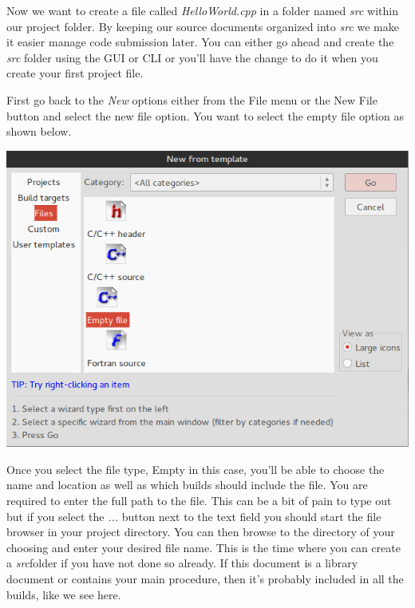 \documentclass[10pt]{article}
\begin{document}
Now we want to create a file called \textit{HelloWorld.cpp} in a folder named \textit{src} within our project folder. By keeping our source documents organized into \textit{src} we make it easier manage code submission later. You can either go ahead and create the \textit{src} folder using the GUI or CLI or you'll have the change to do it when you create your first project file.

First go back to the \textit{New} options either from the File menu or the New File button and select the new file option. You want to select the empty file option as shown below.

\vspace{.1in}
\begin{center}
\includegraphics[scale=.5]{CB_NewFileEmptyCPP.png}
\end{center}
\vspace{.1in}

Once you select the file type, Empty in this case, you'll be able to choose the name and location as well as which builds should include the file. You are required to enter the full path to the file. This can be a bit of pain to type out but if you select the \textit{...} button next to the text field you should start the file browser in your project directory. You can then browse to the directory of your choosing and enter your desired file name. This is the time where you can create a \textit{src}folder if you have not done so already. If this document is a library document or contains your main procedure, then it's probably included in all the builds, like we see here.
\end{document}
